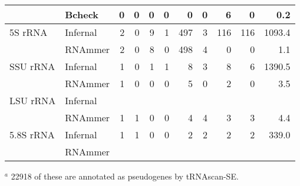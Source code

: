 \begin{table}
\begin{center}
\begin{tabular}{|l|l|rr|rr|rr|rr|r|}
                 &  Bcheck           &    0 &   0 &    0 &   0 &    0 &   0 &    6 &   0 &     0.2  \\ \hline 
5S rRNA          &  Infernal         &    2 &   0 &    9 &   1 &  497 &   3 &  116 & 116 &  1093.4  \\ 
                 &  RNAmmer          &    2 &   0 &    8 &   0 &  498 &   4 &    0 &   0 &     1.1  \\ \hline 
SSU rRNA         &  Infernal         &    1 &   0 &    1 &   1 &    8 &   3 &    8 &   6 &  1390.5  \\ 
                 &  RNAmmer          &    1 &   0 &    0 &   0 &    5 &   0 &    2 &   0 &     3.5  \\ \hline 
LSU rRNA         &  Infernal         &      &     &      &     &      &     &      &     &          \\ 
                 &  RNAmmer          &    1 &   1 &    0 &   0 &    4 &   4 &    3 &   3 &     4.4  \\ \hline 
5.8S rRNA        &  Infernal         &    1 &   1 &    0 &   0 &    2 &   2 &    2 &   2 &   339.0  \\ 
                 &  RNAmmer          &      &     &      &     &      &     &      &     &          \\ \hline 
\end{tabular}
\end{center}

$^a$ 22918 of these are annotated as pseudogenes by tRNAscan-SE.

\label{tbl:compare-euk}
\end{table}
